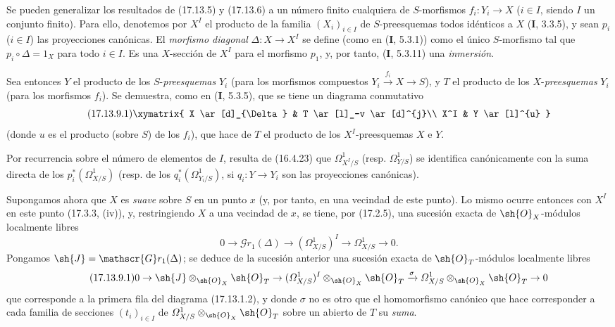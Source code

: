 \begin{env}[17.13.9]
\label{IV.17.13.9}
Se pueden generalizar los resultados de (17.13.5) y (17.13.6) a un número finito cualquiera de $S$-morfismos $f_i:Y_i\to X$ ($i\in I$, siendo $I$ un conjunto finito). Para ello, denotemos por $X^I$ el producto de la familia $(X_i)_{i\in I}$ de $S$-preesquemas todos idénticos a $X$ (\textbf I, 3.3.5), y sean $p_i$ ($i\in I$) las proyecciones canónicas. El \emph{morfismo diagonal} $\Delta:X\to X^I$ se define (como en (\textbf I, 5.3.1)) como el único $S$-morfismo tal que $p_i\circ\Delta=1_X$ para todo $i\in I$. Es una $X$-sección de $X^I$ para el morfismo $p_1$, y, por tanto, (\textbf I, 5.3.11) una \emph{inmersión}.


Sea entonces $Y$ el producto de los $S$-\emph{preesquemas} $Y_i$ (para los morfismos compuestos $Y_i\xrightarrow{f_i}X\to S$), y $T$ el producto de los $X$-\emph{preesquemas} $Y_i$ (para los morfismos $f_i$). Se demuestra, como en (\textbf I, 5.3.5), que se tiene un diagrama conmutativo
\[
\label{IV.17.13.9.1}
\tag{17.13.9.1}
\xymatrix{
  X \ar[d]_{\Delta} & T \ar[l]_-v \ar[d]^{j}\\
  X^I & Y \ar[l]^{u}
}
\]
(donde $u$ es el producto (sobre $S$) de los $f_i$), que hace de $T$ el producto de los $X^I$-preesquemas $X$ e $Y$.

Por recurrencia sobre el número de elementos de $I$, resulta de (16.4.23) que $\varOmega^1_{X^I/S}$ (resp. $\varOmega^1_{Y/S}$) se identifica canónicamente con la suma directa de los $p_i^*(\varOmega^1_{X/S})$ (resp. de los $q_i^*(\varOmega^1_{Y_i/S})$, si $q_i:Y\to Y_i$ son las proyecciones canónicas).

Supongamos ahora que $X$ es \emph{suave} sobre $S$ en un punto $x$ (y, por tanto, en una vecindad de este punto). Lo mismo ocurre entonces con $X^I$ en este punto (17.3.3, (iv)), y, restringiendo $X$ a una vecindad de $x$, se tiene, por (17.2.5), una sucesión exacta de $\sh{O}_X$-módulos localmente libres
\[
0\to\mathscr{G}r_1(\Delta)\to(\varOmega^1_{X/S})^I\to\varOmega^1_{X/S}\to0.
\]
Pongamos $\sh{J}=\mathscr{G}r_1(\Delta)$; se deduce de la sucesión anterior una sucesión exacta de $\sh{O}_T$-módulos localmente libres
\[
\label{IV.17.13.9.1-seq}
\tag{17.13.9.1}
0\to\sh{J}\otimes_{\sh{O}_X}\sh{O}_T\to(\varOmega^1_{X/S})^I\otimes_{\sh{O}_X}\sh{O}_T\xrightarrow{\sigma}\varOmega^1_{X/S}\otimes_{\sh{O}_X}\sh{O}_T\to0
\]
que corresponde a la primera fila del diagrama (17.13.1.2), y donde $\sigma$ no es otro que el homomorfismo canónico que hace corresponder a cada familia de secciones $(t_i)_{i\in I}$ de $\varOmega^1_{X/S}\otimes_{\sh{O}_X}\sh{O}_T$ sobre un abierto de $T$ su \emph{suma}.


\end{env}
